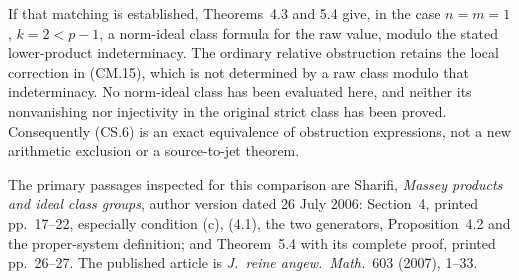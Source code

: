If that matching is established, Theorems~4.3 and 5.4
give, in the case \(n=m=1\), \(k=2<p-1\), a norm-ideal
class formula for the raw value, modulo the stated
lower-product indeterminacy.  The ordinary relative
obstruction retains the local correction in (CM.15),
which is not determined by a raw class modulo that
indeterminacy.  No norm-ideal class has been evaluated
here, and neither its nonvanishing nor injectivity in
the original strict class has been proved.  Consequently
(CS.6) is an exact equivalence of obstruction expressions,
not a new arithmetic exclusion or a source-to-jet theorem.

The primary passages inspected for this comparison are
Sharifi, \emph{Massey products and ideal class groups},
author version dated 26 July 2006: Section~4, printed
pp.~17--22, especially condition (c), (4.1), the two
generators, Proposition~4.2 and the proper-system
definition; and Theorem~5.4 with its complete proof,
printed pp.~26--27.  The published article is
\emph{J.~reine angew.~Math.}~603 (2007), 1--33.

